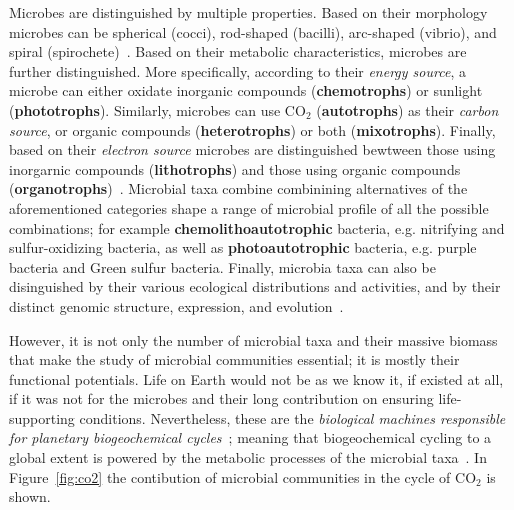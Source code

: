       Microbes are distinguished by multiple properties.
      Based on their morphology microbes can be spherical (cocci), rod-shaped (bacilli),
      arc-shaped (vibrio), and spiral (spirochete)~\cite{dunlap2001microbial}.
      Based on their metabolic characteristics, microbes are further distinguished. 
      More specifically, according to their \textit{energy source}, a microbe
      can either oxidate inorganic compounds (\textbf{chemotrophs}) or sunlight (\textbf{phototrophs}).
      Similarly, microbes can use CO$_2$ (\textbf{autotrophs}) as their \textit{carbon source},
      or organic compounds (\textbf{heterotrophs}) or both (\textbf{mixotrophs}).
      Finally, based on their \textit{electron source} 
      microbes are distinguished bewtween those using inorgarnic compounds (\textbf{lithotrophs}) and those using organic compounds (\textbf{organotrophs})~\cite{madigan2018brock}.
      Microbial taxa combine combinining alternatives of the aforementioned categories 
      shape a range of microbial profile of all the possible combinations; for example      \textbf{chemolithoautotrophic} bacteria, 
      e.g. nitrifying and sulfur-oxidizing bacteria, as well
      as \textbf{photoautotrophic} bacteria, 
      e.g. purple bacteria and Green sulfur bacteria. 
      Finally, microbia taxa can also be disinguished by their various ecological distributions and activities, 
      and by their distinct genomic structure, expression, and evolution~\cite{dunlap2001microbial}. 

      \fi 
      However, it is not only the number of microbial taxa and their massive biomass that
      make the study of microbial communities essential; 
      it is mostly their functional potentials. 
      Life on Earth would not be as we know it, if existed at all, if it was not for the 
      microbes and their long contribution on ensuring life-supporting conditions. 
      Nevertheless, these are the \textit{biological machines responsible for planetary
      biogeochemical cycles}~\cite{falkowski2008microbial}; meaning that biogeochemical cycling 
      to a global extent
      is powered by the metabolic processes of the microbial taxa~\cite{louca2016decoupling}. 
      In Figure~\ref{fig:co2} the contibution of microbial communities 
      in the cycle of CO$_2$ is shown. 

